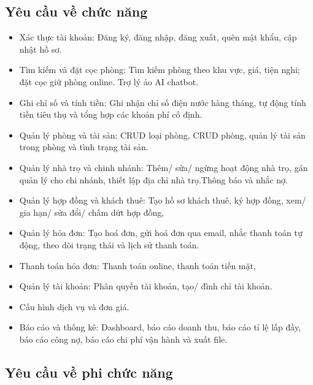 \documentclass[a4paper,oneside]{report}
\begin{document}
\subsection{Yêu cầu về chức năng}

\begin{itemize}
    \item 
    Xác thực tài khoản: Đăng ký, đăng nhập, đăng xuất, quên mật khẩu, cập nhật hồ sơ.
    \item 
    Tìm kiếm và đặt cọc phòng: Tìm kiếm phòng theo khu vực, giá, tiện nghi; đặt cọc giữ phòng online.
    Trợ lý ảo AI chatbot.
\item 
Ghi chỉ số và tính tiền: Ghi nhận chỉ số điện nước hàng tháng, tự động tính tiền tiêu thụ và tổng hợp các khoản phí cố định.
\item 
Quản lý phòng và tài sản: CRUD loại phòng, CRUD phòng, quản lý tài sản trong phòng và tình trạng tài sản.
\item 
Quản lý nhà trọ và chinh nhánh: Thêm/ sửa/ ngừng hoạt động nhà trọ, gán quản lý cho chi nhánh, thiết lập địa chỉ nhà trọ.Thông báo và nhắc nợ.
\item 
Quản lý hợp đồng và khách thuê: Tạo hồ sơ khách thuê, ký hợp đồng, xem/ gia hạn/ sửa đổi/ chấm dứt hợp đồng,
\item 
Quản lý hóa đơn: Tạo hoá đơn, gửi hoá đơn qua email, nhắc thanh toán tự động, theo dõi trạng thái và lịch sử thanh toán.
\item 
Thanh toán hóa đơn: Thanh toán online, thanh toán tiền mặt,
\item 
Quản lý tài khoản: Phân quyền tài khoản, tạo/ đình chỉ tài khoản.
\item 
Cấu hình dịch vụ và đơn giá.
\item 
Báo cáo và thống kê: Dashboard, báo cáo doanh thu, báo cáo tỉ lệ lấp đầy, báo cáo công nợ, báo cáo chi phí vận hành và xuất file.

\end{itemize}

\subsection{Yêu cầu về phi chức năng}
\end{document}
